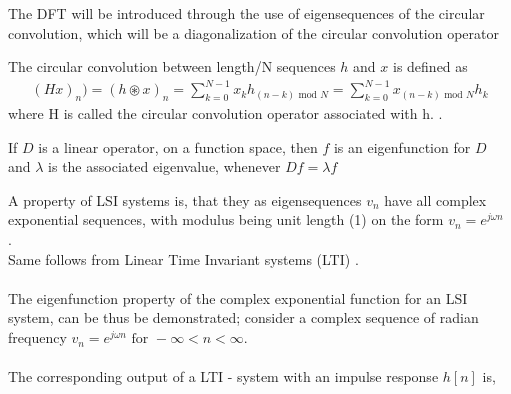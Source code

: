 The DFT will be introduced through the use of eigensequences of the circular convolution, which will be a diagonalization of the circular convolution operator

\begin{definition}
 	The circular convolution between length/N sequences $h$ and $x$ is defined as
\begin{align*}
	(Hx)_n) = (h \circledast x)_n = \sum_{k = 0}^{N-1} x_k h_{(n-k) \text{ mod $N$}} =\sum_{k = 0}^{N-1} x_{(n-k) \text{ mod $N$}} h_k
\end{align*}
where H is called the circular convolution operator associated with h. .
\end{definition} \cite{FSP}

\begin{definition}[Eigenfunction]
	If $D$ is a linear operator, on a function space, then $f$ is an eigenfunction for $D$ and $\lambda$ is the associated eigenvalue, whenever $Df = \lambda f$
\end{definition}
\cite{Eigenfunctions}

A property of LSI systems is, that they as eigensequences $v_n$ have all complex exponential sequences, with modulus being unit length (1) on the form $v_n = e^{j \omega n}$ \cite{FSP}.\\ Same follows from Linear Time Invariant systems (LTI) \cite{DTSP}.
\\\\
The eigenfunction property of the complex exponential function for an LSI system, can be thus be demonstrated; consider a complex sequence of radian frequency $v_n = e^{j\omega n} \text{ for } -\infty < n < \infty$.
\\\\
The corresponding output of a LTI - system with an impulse response $h[n]$ is,

